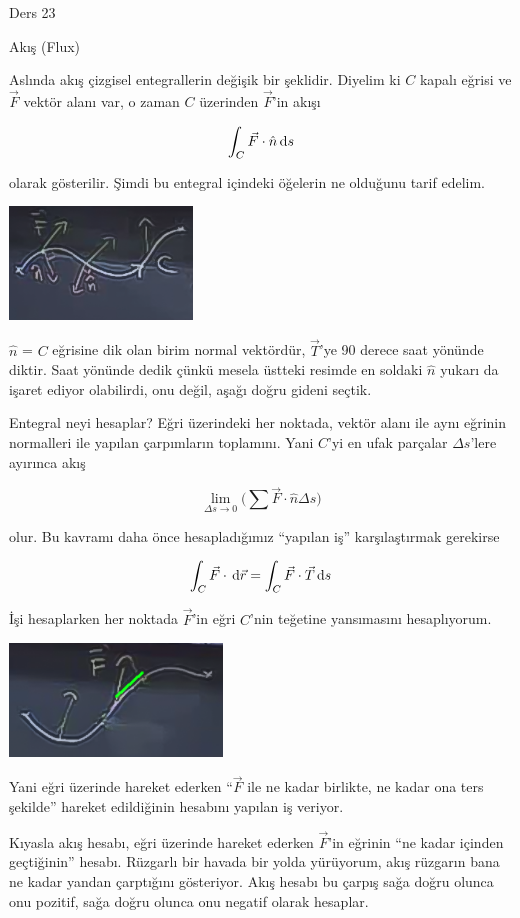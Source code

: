 \documentclass[12pt,fleqn]{article}\usepackage{../../common}
\begin{document}
Ders 23

Akış (Flux)

Aslında akış çizgisel entegrallerin değişik bir şeklidir. Diyelim ki $C$ kapalı
eğrisi ve $\vec{F}$ vektör alanı var, o zaman $C$ üzerinden $\vec{F}$'in akışı

$$ \int_C \vec{F} \cdot \hat{n} \,\mathrm{d} s $$

olarak gösterilir. Şimdi bu entegral içindeki öğelerin ne olduğunu tarif
edelim. 
\begin{center}
\includegraphics[height=3cm]{23_1.png}
\end{center}
$\hat{n}$ = $C$ eğrisine dik olan birim normal vektördür, $\vec{T}$'ye 90
derece saat yönünde diktir. Saat yönünde dedik çünkü mesela üstteki resimde
en soldaki $\hat{n}$ yukarı da işaret ediyor olabilirdi, onu değil, aşağı
doğru gideni seçtik.

Entegral neyi hesaplar? Eğri üzerindeki her noktada, vektör alanı ile aynı
eğrinin normalleri ile yapılan çarpımların toplamını. Yani $C$'yi en ufak
parçalar $\Delta s$'lere ayırınca akış

$$
\lim_{\Delta s \to 0} 
\bigg( \sum \vec{F} \cdot \hat{n}  \Delta s \bigg)
$$

olur. Bu kavramı daha önce hesapladığımız ``yapılan iş'' karşılaştırmak
gerekirse


$$ \int_C \vec{F} \cdot \,\mathrm{d}\vec{r} = \int_C \vec{F} \cdot \vec{T} \,\mathrm{d} s $$


İşi hesaplarken her noktada $\vec{F}$'in eğri $C$'nin teğetine yansımasını
hesaplıyorum. 
\begin{center}
\includegraphics[height=3cm]{23_2.png}
\end{center}
Yani eğri üzerinde hareket ederken ``$\vec{F}$ ile ne kadar birlikte, ne
kadar ona ters şekilde'' hareket edildiğinin hesabını yapılan iş veriyor. 

Kıyasla akış hesabı, eğri üzerinde hareket ederken $\vec{F}$'in eğrinin
``ne kadar içinden geçtiğinin'' hesabı. Rüzgarlı bir havada bir yolda
yürüyorum, akış rüzgarın bana ne kadar yandan çarptığını gösteriyor. Akış
hesabı bu çarpış sağa doğru olunca onu pozitif, sağa doğru olunca onu
negatif olarak hesaplar. 
\end{document}
